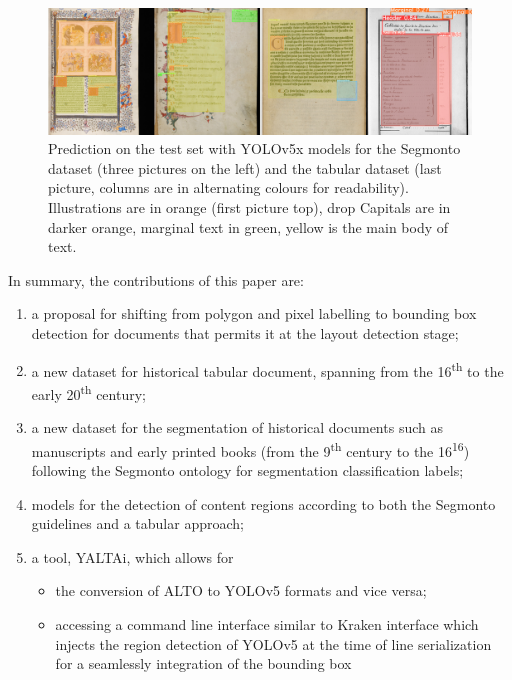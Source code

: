 \documentclass{jdmdh}
\begin{document}
\begin{figure}[ht]
    \centering
    \includegraphics[width=\linewidth]{images/4images.jpg}
    \caption{Prediction on the test set with YOLOv5x models for the Segmonto dataset (three pictures on the left) and the tabular dataset (last picture, columns are in alternating colours for readability). Illustrations are in orange (first picture top), drop Capitals are in darker orange, marginal text in green, yellow is the main body of text.}
    \label{fig:4images}
\end{figure}

In summary, the contributions of this paper are:

\begin{enumerate}
    \item a proposal for shifting from polygon and pixel labelling to bounding box detection for documents that permits it at the layout detection stage;
    \item a new dataset for historical tabular document, spanning from the 16\textsuperscript{th} to the early 20\textsuperscript{th} century;
    \item a new dataset for the segmentation of historical documents such as manuscripts and early printed books (from the 9\textsuperscript{th} century to the 16\textsuperscript{16}) following the Segmonto ontology for segmentation classification labels;
    \item models for the detection of content regions according to both the Segmonto guidelines and a tabular approach;
    \item a tool, YALTAi, which allows for  \begin{itemize}
        \item the conversion of ALTO to YOLOv5 formats and vice versa;
        \item accessing a command line interface similar to Kraken interface which injects the region detection of YOLOv5 at the time of line serialization for a seamlessly integration of the bounding box 
    \end{itemize}
\end{enumerate}
\end{document}

